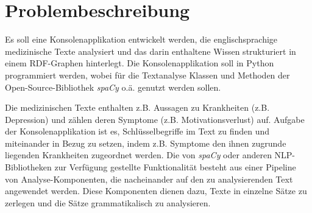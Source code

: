 \section{Problembeschreibung}
\label{sec:problembeschreibung}

Es soll eine Konsolenapplikation entwickelt werden, die englischsprachige medizinische Texte analysiert und das darin enthaltene Wissen strukturiert in einem RDF-Graphen hinterlegt. Die Konsolenapplikation soll in Python programmiert werden, wobei für die Textanalyse Klassen und Methoden der Open-Source-Bibliothek \emph{spaCy} o.ä. genutzt werden sollen.

Die medizinischen Texte enthalten z.B. Aussagen zu Krankheiten (z.B. Depression) und zählen deren Symptome (z.B. Motivationsverlust) auf. Aufgabe der Konsolenapplikation ist es, Schlüsselbegriffe im Text zu finden und miteinander in Bezug zu setzen, indem z.B. Symptome den ihnen zugrunde liegenden Krankheiten zugeordnet werden. Die von \emph{spaCy} oder anderen NLP-Bibliotheken zur Verfügung gestellte Funktionalität besteht aus einer Pipeline von Analyse-Komponenten, die nacheinander auf den zu analysierenden Text angewendet werden. Diese Komponenten dienen dazu, Texte in einzelne Sätze zu zerlegen und die Sätze grammatikalisch zu analysieren.

